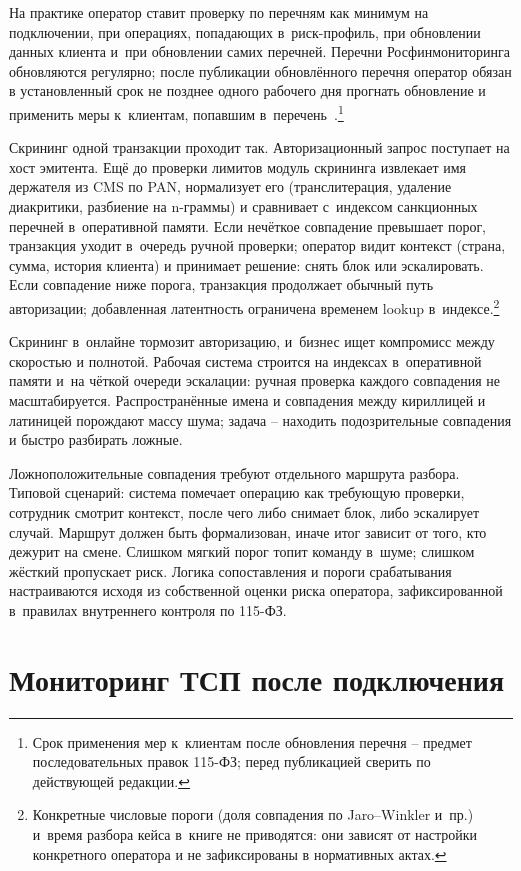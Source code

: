 На практике оператор ставит проверку по перечням как минимум
на подключении, при операциях, попадающих в~риск-профиль,
при обновлении данных клиента и~при обновлении самих
перечней. Перечни Росфинмониторинга обновляются регулярно;
после публикации обновлённого перечня оператор обязан в
установленный срок не позднее одного рабочего дня
прогнать обновление и применить меры к~клиентам, попавшим
в~перечень~\cite{rosfinmonitoring-lists,fz-115}.\footnote{Срок
применения мер к~клиентам после обновления перечня -- предмет
последовательных правок 115-ФЗ; перед публикацией сверить
по действующей редакции.}

Скрининг одной транзакции проходит так.
Авторизационный запрос поступает на хост эмитента. Ещё до
проверки лимитов модуль скрининга извлекает имя держателя
из CMS по PAN, нормализует его (транслитерация, удаление
диакритики, разбиение на n-граммы) и сравнивает с~индексом
санкционных перечней в~оперативной памяти. Если нечёткое
совпадение превышает порог, транзакция уходит в~очередь
ручной проверки; оператор видит контекст (страна, сумма,
история клиента) и принимает решение: снять блок или
эскалировать. Если совпадение ниже порога, транзакция
продолжает обычный путь авторизации; добавленная латентность
ограничена временем lookup в~индексе.\footnote{Конкретные
числовые пороги (доля совпадения по Jaro--Winkler и~пр.)
и~время разбора кейса в~книге не приводятся: они зависят
от настройки конкретного оператора и не зафиксированы в
нормативных актах.}

Скрининг в~онлайне тормозит авторизацию, и~бизнес ищет компромисс
между скоростью и полнотой. Рабочая система строится на индексах
в~оперативной памяти и~на чёткой очереди эскалации: ручная проверка
каждого совпадения не масштабируется. Распространённые имена
и совпадения между кириллицей и латиницей порождают массу шума;
задача -- находить подозрительные совпадения и быстро разбирать
ложные.

Ложноположительные совпадения требуют отдельного маршрута разбора.
Типовой сценарий: система помечает операцию как требующую проверки,
сотрудник смотрит контекст, после чего либо снимает блок, либо
эскалирует случай. Маршрут должен быть формализован, иначе итог
зависит от того, кто дежурит на смене. Слишком мягкий порог топит
команду в~шуме; слишком жёсткий пропускает риск. Логика сопоставления
и пороги срабатывания настраиваются исходя из собственной оценки
риска оператора, зафиксированной в~правилах внутреннего контроля
по 115-ФЗ.

\section{Мониторинг ТСП после подключения}\label{sec:compliance-merchant-monitoring}

